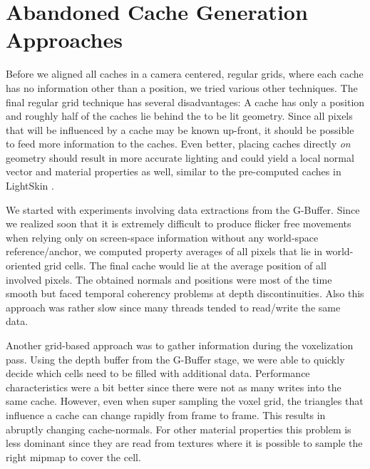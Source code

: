 \documentclass[thesis.tex]{subfiles}
\begin{document}
\section{Abandoned Cache Generation Approaches} \label{chap:abandoned}


Before we aligned all caches in a camera centered, regular grids, where each cache has no information other than a position, we tried various other techniques. %
The final regular grid technique has several disadvantages:
A cache has only a position and roughly half of the caches lie behind the to be lit geometry.
Since all pixels that will be influenced by a cache may be known up-front, it should be possible to feed more information to the caches.
Even better, placing caches directly \emph{on} geometry should result in more accurate lighting and could yield a local normal vector and material properties as well, similar to the pre-computed caches in LightSkin \cite{bib:LightskinPaper}.

We started with experiments involving data extractions from the G-Buffer.
Since we realized soon that it is extremely difficult to produce flicker free movements when relying only on screen-space information without any world-space reference/anchor, we computed property averages of all pixels that lie in world-oriented grid cells.
The final cache would lie at the average position of all involved pixels.
The obtained normals and positions were most of the time smooth but faced temporal coherency problems at depth discontinuities.
Also this approach was rather slow since many threads tended to read/write the same data.

Another grid-based approach was to gather information during the voxelization pass.
Using the depth buffer from the G-Buffer stage, we were able to quickly decide which cells need to be filled with additional data.
Performance characteristics were a bit better since there were not as many writes into the same cache.
However, even when super sampling the voxel grid, the triangles that influence a cache can change rapidly from frame to frame.
This results in abruptly changing cache-normals.
For other material properties this problem is less dominant since they are read from textures where it is possible to sample the right mipmap to cover the cell.
\end{document}
